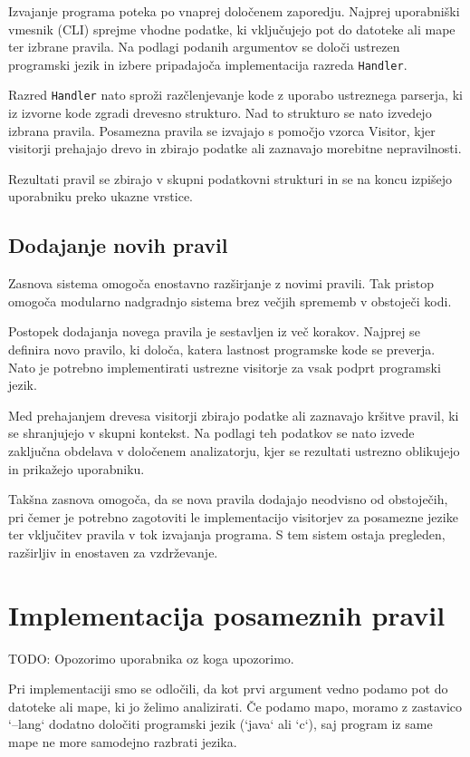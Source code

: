 \documentclass[a4paper,12pt,openright]{book}
\begin{document}
Izvajanje programa poteka po vnaprej določenem zaporedju. Najprej uporabniški vmesnik (CLI) sprejme vhodne podatke, ki vključujejo pot do datoteke ali mape ter izbrane pravila. Na podlagi podanih argumentov se določi ustrezen programski jezik in izbere pripadajoča implementacija razreda \texttt{Handler}.

Razred \texttt{Handler} nato sproži razčlenjevanje kode z uporabo ustreznega parserja, ki iz izvorne kode zgradi drevesno strukturo. Nad to strukturo se nato izvedejo izbrana pravila. Posamezna pravila se izvajajo s pomočjo vzorca Visitor, kjer visitorji prehajajo drevo in zbirajo podatke ali zaznavajo morebitne nepravilnosti.

Rezultati pravil se zbirajo v skupni podatkovni strukturi in se na koncu izpišejo uporabniku preko ukazne vrstice.

\subsection{Dodajanje novih pravil}

Zasnova sistema omogoča enostavno razširjanje z novimi pravili. Tak pristop omogoča modularno nadgradnjo sistema brez večjih sprememb v obstoječi kodi.

Postopek dodajanja novega pravila je sestavljen iz več korakov. Najprej se definira novo pravilo, ki določa, katera lastnost programske kode se preverja. Nato je potrebno implementirati ustrezne visitorje za vsak podprt programski jezik.

Med prehajanjem drevesa visitorji zbirajo podatke ali zaznavajo kršitve pravil, ki se shranjujejo v skupni kontekst. Na podlagi teh podatkov se nato izvede zaključna obdelava v določenem analizatorju, kjer se rezultati ustrezno oblikujejo in prikažejo uporabniku.

Takšna zasnova omogoča, da se nova pravila dodajajo neodvisno od obstoječih, pri čemer je potrebno zagotoviti le implementacijo visitorjev za posamezne jezike ter vključitev pravila v tok izvajanja programa. S tem sistem ostaja pregleden, razširljiv in enostaven za vzdrževanje.

\section{Implementacija posameznih pravil}

TODO: Opozorimo uporabnika oz koga upozorimo.

Pri implementaciji smo se odločili, da kot prvi argument vedno podamo pot do datoteke ali mape, ki jo želimo analizirati. Če podamo mapo, moramo z zastavico `--lang` dodatno določiti programski jezik (`java` ali `c`), saj program iz same mape ne more samodejno razbrati jezika.
\end{document}
